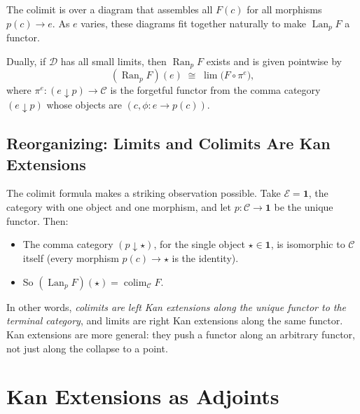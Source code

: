 The colimit is over a diagram that assembles all $F(c)$ for all morphisms
$p(c) \to e$. As $e$ varies, these diagrams fit together naturally to make
$\operatorname{Lan}_p F$ a functor.

\begin{theorem}
Dually, if $\mathcal{D}$ has all small limits, then $\operatorname{Ran}_p F$ exists
and is given pointwise by
\[
  (\operatorname{Ran}_p F)(e) \;\cong\; \lim\bigl(F \circ \pi^e\bigr),
\]
where $\pi^e : (e \downarrow p) \to \mathcal{C}$ is the forgetful functor from the
comma category $(e \downarrow p)$ whose objects are $(c, \phi : e \to p(c))$.
\end{theorem}

\subsection{Reorganizing: Limits and Colimits Are Kan Extensions}

The colimit formula makes a striking observation possible. Take $\mathcal{E} = \mathbf{1}$,
the category with one object and one morphism, and let $p : \mathcal{C} \to \mathbf{1}$
be the unique functor. Then:
\begin{itemize}
  \item The comma category $(p \downarrow \star)$, for the single object $\star \in \mathbf{1}$,
    is isomorphic to $\mathcal{C}$ itself (every morphism $p(c) \to \star$ is the
    identity).
  \item So $(\operatorname{Lan}_p F)(\star) = \operatorname{colim}_{\mathcal{C}} F$.
\end{itemize}

\begin{center}
\end{center}

In other words, \emph{colimits are left Kan extensions along the unique functor
to the terminal category}, and limits are right Kan extensions along the same functor.
Kan extensions are more general: they push a functor along an arbitrary functor,
not just along the collapse to a point.

\section{Kan Extensions as Adjoints}
\label{sec:kan-as-adjoint}

